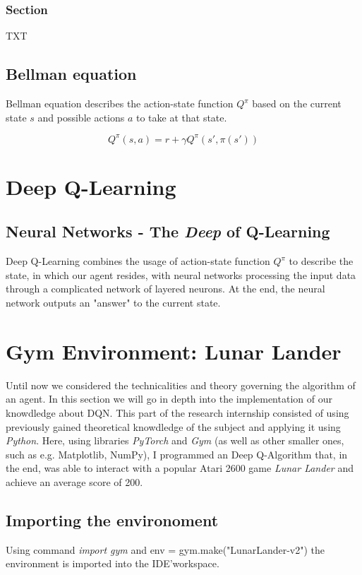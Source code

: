 \documentclass{article}
\begin{document}
\subsubsection{Section}
TXT

\subsection{Bellman equation}
Bellman equation describes the action-state function $Q^\pi$ based on the current state $s$ and possible actions $a$ to take at that state.

\begin{equation}
\label{eqn:bellman}
Q^\pi(s,a) = r+\gamma Q^\pi(s',\pi(s'))
\end{equation}

\section{Deep Q-Learning}
\subsection{Neural Networks - The \textit{Deep} of Q-Learning}
Deep Q-Learning combines the usage of action-state function $Q^\pi$ to describe the state, in which our agent resides, with neural networks processing the input data through a complicated network of layered neurons. At the end, the neural network outputs an "answer" to the current state.

\section{Gym Environment: Lunar Lander}
Until now we considered the technicalities and theory governing the algorithm of an agent. In this section we will go in depth into the implementation of our knowdledge about DQN. This part of the research internship consisted of using previously gained theoretical knowdledge of the subject and applying it using \textit{Python}. Here, using libraries \textit{PyTorch} and \textit{Gym} (as well as other smaller ones, such as e.g. Matplotlib, NumPy), I programmed an Deep Q-Algorithm that, in the end, was able to interact with a popular Atari 2600 game \textit{Lunar Lander} and achieve an average score of 200.

\subsection{Importing the environoment}
Using command \textit{import gym} and env = gym.make("LunarLander-v2") the environment is imported into the IDE'\footnotemark \space workspace.
\end{document}
